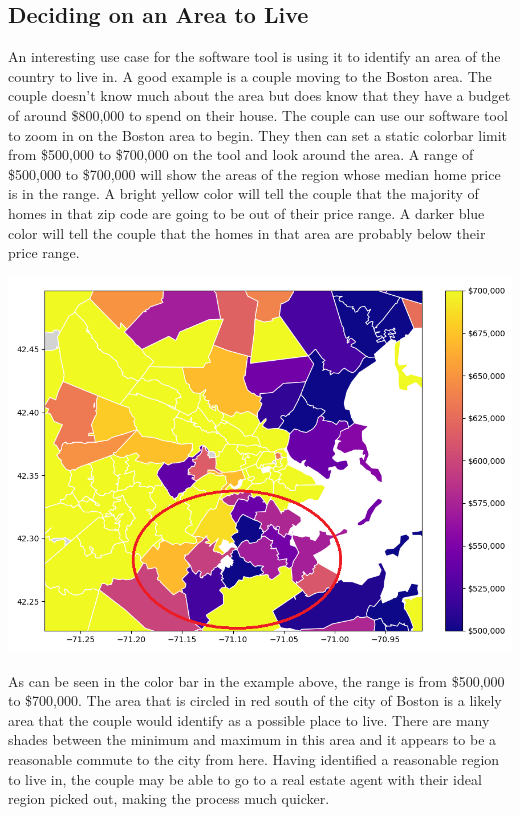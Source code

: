 \documentclass{article}
\begin{document}
\subsection{Deciding on an Area to Live}
An interesting use case for the software tool is using it to identify an area of the country to live in. A good example is a couple moving to the Boston area. The couple doesn't know much about the area but does know that they have a budget of around \$800,000 to spend on their house. The couple can use our software tool to zoom in on the Boston area to begin. They then can set a static colorbar limit from \$500,000 to \$700,000 on the tool and look around the area. A range of \$500,000 to \$700,000 will show the areas of the region whose median home price is in the range. A bright yellow color will tell the couple that the majority of homes in that zip code are going to be out of their price range. A darker blue color will tell the couple that the homes in that area are probably below their price range. 

\begin{center}
\includegraphics[scale=0.5]{five_hundred_to_seven_hundred.png} 
\end{center}

As can be seen in the color bar in the example above, the range is from \$500,000 to \$700,000. The area that is circled in red south of the city of Boston is a likely area that the couple would identify as a possible place to live. There are many shades between the minimum and maximum in this area and it appears to be a reasonable commute to the city from here. Having identified a reasonable region to live in, the couple may be able to go to a real estate agent with their ideal region picked out, making the process much quicker.
\end{document}
